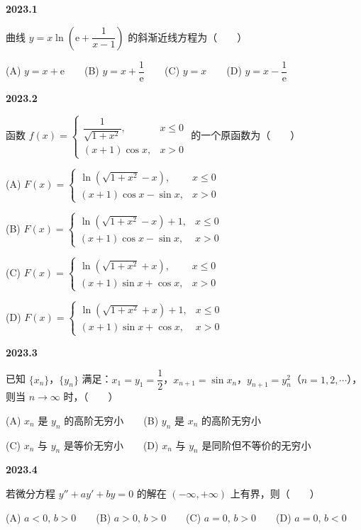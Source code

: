 \documentclass[UTF8,12pt,fontset=windows]{ctexart}
\begin{document}
{\large\bfseries 2023.1}

曲线 $y = x\ln\left(\mathrm{e} + \dfrac{1}{x-1}\right)$ 的斜渐近线方程为（　　）

(A) $y = x + \mathrm{e}$　　(B) $y = x + \dfrac{1}{\mathrm{e}}$　　(C) $y = x$　　(D) $y = x - \dfrac{1}{\mathrm{e}}$

\vfill
\newpage
{\large\bfseries 2023.2}

函数 $f(x) = \begin{cases} \dfrac{1}{\sqrt{1+x^2}}, & x \leqslant 0 \\ (x+1)\cos x, & x > 0 \end{cases}$ 的一个原函数为（　　）

(A) $F(x) = \begin{cases} \ln\left(\sqrt{1+x^2} - x\right), & x \leqslant 0 \\ (x+1)\cos x - \sin x, & x > 0 \end{cases}$

(B) $F(x) = \begin{cases} \ln\left(\sqrt{1+x^2} - x\right) + 1, & x \leqslant 0 \\ (x+1)\cos x - \sin x, & x > 0 \end{cases}$

(C) $F(x) = \begin{cases} \ln\left(\sqrt{1+x^2} + x\right), & x \leqslant 0 \\ (x+1)\sin x + \cos x, & x > 0 \end{cases}$

(D) $F(x) = \begin{cases} \ln\left(\sqrt{1+x^2} + x\right) + 1, & x \leqslant 0 \\ (x+1)\sin x + \cos x, & x > 0 \end{cases}$

\vfill
\newpage
{\large\bfseries 2023.3}

已知 $\{x_n\}$，$\{y_n\}$ 满足：$x_1 = y_1 = \dfrac{1}{2}$，$x_{n+1} = \sin x_n$，$y_{n+1} = y_n^2$（$n = 1, 2, \cdots$），则当 $n \to \infty$ 时，（　　）

(A) $x_n$ 是 $y_n$ 的高阶无穷小　　(B) $y_n$ 是 $x_n$ 的高阶无穷小

(C) $x_n$ 与 $y_n$ 是等价无穷小　　(D) $x_n$ 与 $y_n$ 是同阶但不等价的无穷小

\vfill
\newpage
{\large\bfseries 2023.4}

若微分方程 $y'' + ay' + by = 0$ 的解在 $(-\infty, +\infty)$ 上有界，则（　　）

(A) $a < 0,\, b > 0$　　(B) $a > 0,\, b > 0$　　(C) $a = 0,\, b > 0$　　(D) $a = 0,\, b < 0$
\end{document}

